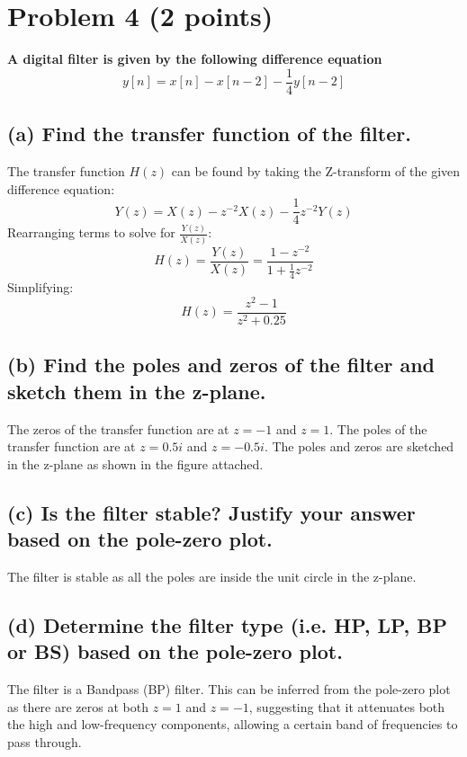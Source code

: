 \section{Problem 4 (2 points)}
\textbf{A digital filter is given by the following difference equation}
\begin{equation*}
    y[n]=x[n]-x[n-2]-\frac{1}{4} y[n-2]
\end{equation*}

\subsection*{(a) Find the transfer function of the filter.}
The transfer function \( H(z) \) can be found by taking the Z-transform of the given difference equation:
\begin{equation*}
    Y(z) = X(z) - z^{-2}X(z) - \frac{1}{4}z^{-2}Y(z)
\end{equation*}
Rearranging terms to solve for \( \frac{Y(z)}{X(z)} \):
\begin{equation*}
    H(z) = \frac{Y(z)}{X(z)} = \frac{1 - z^{-2}}{1 + \frac{1}{4}z^{-2}}
\end{equation*}
Simplifying:
\begin{equation*}
    H(z) = \frac{z^2 - 1}{z^2 + 0.25}
\end{equation*}

\subsection*{(b) Find the poles and zeros of the filter and sketch them in the z-plane.}
The zeros of the transfer function are at \( z = -1 \) and \( z = 1 \).
The poles of the transfer function are at \( z = 0.5i \) and \( z = -0.5i \).
The poles and zeros are sketched in the z-plane as shown in the figure attached.



\subsection*{(c) Is the filter stable? Justify your answer based on the pole-zero plot.}
The filter is stable as all the poles are inside the unit circle in the z-plane. 

\subsection*{(d) Determine the filter type (i.e. HP, LP, BP or BS) based on the pole-zero plot.}
The filter is a Bandpass (BP) filter. This can be inferred from the pole-zero plot as there are zeros at both \( z = 1 \) and \( z = -1 \), suggesting that it attenuates both the high and low-frequency components, allowing a certain band of frequencies to pass through.

